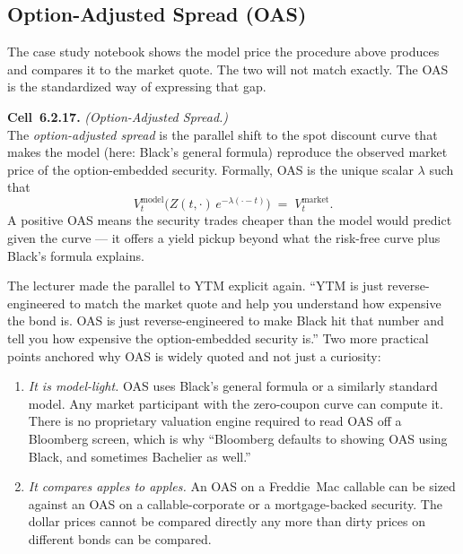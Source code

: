 \subsection{Option-Adjusted Spread (OAS)}\label{L5-sec:oas}

The case study notebook shows the model price the procedure above
produces and compares it to the market quote. The two will not match
exactly. The OAS is the standardized way of expressing that gap.

\begin{keyblock}
\textbf{Cell~6.2.17.} \emph{(Option-Adjusted Spread.)}\\
The \emph{option-adjusted spread} is the parallel shift to the spot
discount curve that makes the model (here: Black's general formula)
reproduce the observed market price of the option-embedded security.
Formally, OAS is the unique scalar $\lambda$ such that
\[
  V^{\text{model}}_t\bigl(Z(t,\cdot)\,e^{-\lambda(\cdot - t)}\bigr)
  \;=\; V^{\text{market}}_t.
\]
A positive OAS means the security trades cheaper than the model would
predict given the curve --- it offers a yield pickup beyond what the
risk-free curve plus Black's formula explains.
\end{keyblock}

The lecturer made the parallel to YTM explicit again. ``YTM is just
reverse-engineered to match the market quote and help you understand
how expensive the bond is. OAS is just reverse-engineered to make
Black hit that number and tell you how expensive the option-embedded
security is.'' Two more practical points anchored why OAS is widely
quoted and not just a curiosity:

\begin{enumerate}[label=(\arabic*)]
  \item \emph{It is model-light.} OAS uses Black's general formula or a
        similarly standard model. Any market participant with the
        zero-coupon curve can compute it. There is no proprietary
        valuation engine required to read OAS off a Bloomberg screen,
        which is why ``Bloomberg defaults to showing OAS using
        Black, and sometimes Bachelier as well.''
  \item \emph{It compares apples to apples.} An OAS on a Freddie~Mac
        callable can be sized against an OAS on a callable-corporate or
        a mortgage-backed security. The dollar prices cannot be
        compared directly any more than dirty prices on different
        bonds can be compared.
\end{enumerate}

